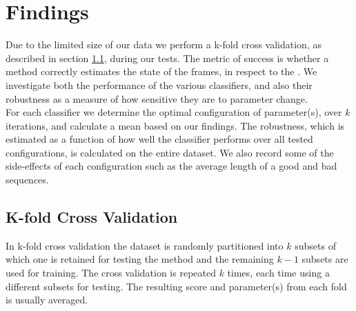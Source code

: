 \section{Findings}
%
Due to the limited size of our data we perform a k-fold cross validation, as described in section \ref{sec:kfoldxval}, during our tests. The metric of success is whether a method correctly estimates the state of the frames, in respect to the . We investigate both the performance of the various classifiers, and also their robustness as a measure of how sensitive they are to parameter change.\\
For each classifier we determine the optimal configuration of parameter(s), over $k$ iterations, and calculate a mean based on our findings. The robustness, which is estimated as a function of how well the classifier performs over all tested configurations, is calculated on the entire dataset. We also record some of the side-effects of each configuration such as the average length of a good and bad sequences.\\
%
\subsection{K-fold Cross Validation}\label{sec:kfoldxval}
%
 In k-fold cross validation the dataset is randomly partitioned into $k$ subsets of which one is retained for testing the method and the remaining $k-1$ subsets are used for training. The cross validation is repeated $k$ times, each time using a different subsets for testing. The resulting score and parameter(s) from each fold is usually averaged.
%
